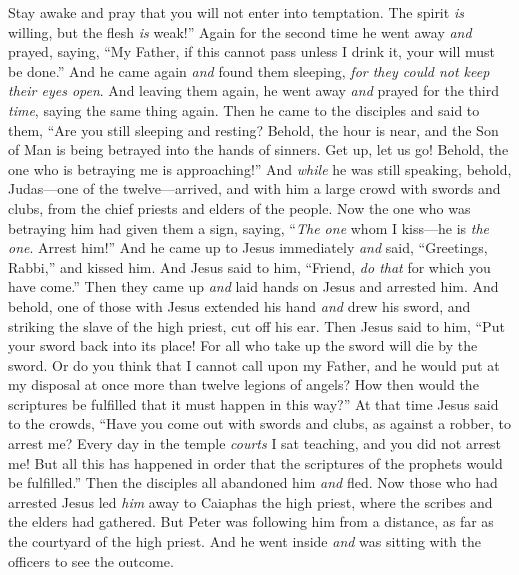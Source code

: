 \begin{biblechapter}
\verse Stay awake and pray that you will not enter into temptation. The spirit \textit{is} willing, but the flesh \textit{is} weak!”
\verse Again for the second time he went away \textit{and} prayed, saying, “My Father, if this cannot pass unless I drink it, your will must be done.”
\verse And he came again \textit{and} found them sleeping, \textit{for they could not keep their eyes open}.
\verse And leaving them again, he went away \textit{and} prayed for the third \textit{time}, saying the same thing again.
\verse Then he came to the disciples and said to them, “Are you still sleeping and resting? Behold, the hour is near, and the Son of Man is being betrayed into the hands of sinners.
\verse Get up, let us go! Behold, the one who is betraying me is approaching!”
 And \textit{while} he was still speaking, behold, Judas—one of the twelve—arrived, and with him a large crowd with swords and clubs, from the chief priests and elders of the people.
\verse Now the one who was betraying him had given them a sign, saying, “\textit{The one} whom I kiss—he is \textit{the one}. Arrest him!”
\verse And he came up to Jesus immediately \textit{and} said, “Greetings, Rabbi,” and kissed him.
\verse And Jesus said to him, “Friend, \textit{do that} for which you have come.” Then they came up \textit{and} laid hands on Jesus and arrested him.
\verse And behold, one of those with Jesus extended his hand \textit{and} drew his sword, and striking the slave of the high priest, cut off his ear.
\verse Then Jesus said to him, “Put your sword back into its place! For all who take up the sword will die by the sword.
\verse Or do you think that I cannot call upon my Father, and he would put at my disposal at once more than twelve legions of angels?
\verse How then would the scriptures be fulfilled that it must happen in this way?”
\verse At that time Jesus said to the crowds, “Have you come out with swords and clubs, as against a robber, to arrest me? Every day in the temple \textit{courts} I sat teaching, and you did not arrest me!
\verse But all this has happened in order that the scriptures of the prophets would be fulfilled.” Then the disciples all abandoned him \textit{and} fled.
 Now those who had arrested Jesus led \textit{him} away to Caiaphas the high priest, where the scribes and the elders had gathered.
\verse But Peter was following him from a distance, as far as the courtyard of the high priest. And he went inside \textit{and} was sitting with the officers to see the outcome.

\end{biblechapter}
